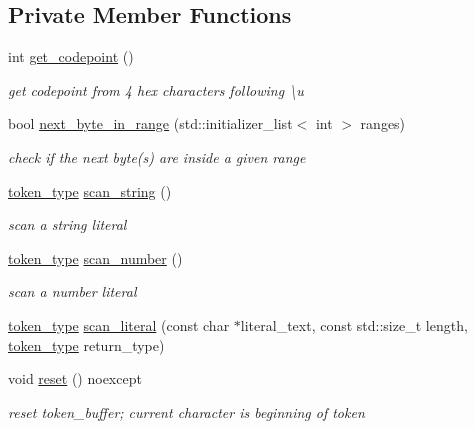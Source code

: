 \subsection*{Private Member Functions}
\begin{DoxyCompactItemize}
\item 
int \hyperlink{classnlohmann_1_1detail_1_1lexer_a820b20e25ff255c3c791c37f2bf48380}{get\+\_\+codepoint} ()
\begin{DoxyCompactList}\small\item\em get codepoint from 4 hex characters following {\ttfamily \textbackslash{}u} \end{DoxyCompactList}\item 
bool \hyperlink{classnlohmann_1_1detail_1_1lexer_a2faa544ab5475523ead81f9cdef41a0a}{next\+\_\+byte\+\_\+in\+\_\+range} (std\+::initializer\+\_\+list$<$ int $>$ ranges)
\begin{DoxyCompactList}\small\item\em check if the next byte(s) are inside a given range \end{DoxyCompactList}\item 
\hyperlink{classnlohmann_1_1detail_1_1lexer_a3f313cdbe187cababfc5e06f0b69b098}{token\+\_\+type} \hyperlink{classnlohmann_1_1detail_1_1lexer_ad271045d1c91df9d6a119482b4aeae7f}{scan\+\_\+string} ()
\begin{DoxyCompactList}\small\item\em scan a string literal \end{DoxyCompactList}\item 
\hyperlink{classnlohmann_1_1detail_1_1lexer_a3f313cdbe187cababfc5e06f0b69b098}{token\+\_\+type} \hyperlink{classnlohmann_1_1detail_1_1lexer_a6bd7e6cdb0380a9df663f1c7f115f34f}{scan\+\_\+number} ()
\begin{DoxyCompactList}\small\item\em scan a number literal \end{DoxyCompactList}\item 
\hyperlink{classnlohmann_1_1detail_1_1lexer_a3f313cdbe187cababfc5e06f0b69b098}{token\+\_\+type} \hyperlink{classnlohmann_1_1detail_1_1lexer_a6f717deb553337736f27cdacccaee536}{scan\+\_\+literal} (const char $\ast$literal\+\_\+text, const std\+::size\+\_\+t length, \hyperlink{classnlohmann_1_1detail_1_1lexer_a3f313cdbe187cababfc5e06f0b69b098}{token\+\_\+type} return\+\_\+type)
\item 
void \hyperlink{classnlohmann_1_1detail_1_1lexer_acba34bc18af19f93186e682d02c3942d}{reset} () noexcept
\begin{DoxyCompactList}\small\item\em reset token\+\_\+buffer; current character is beginning of token \end{DoxyCompactList}\item 

\end{DoxyCompactItemize}
